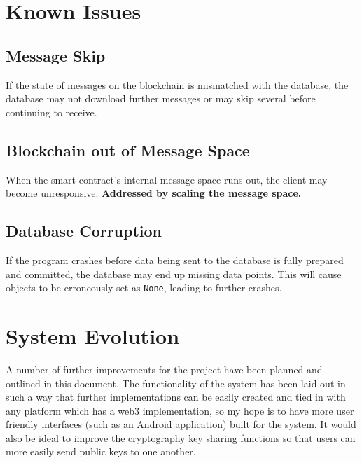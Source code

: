 \documentclass[titlepage]{report}
\begin{document}
\section{Known Issues}
\subsection{Message Skip}
If the state of messages on the \gls{blockchain} is mismatched with the database, the database may not download further messages or may skip several before continuing to receive.
\subsection{Blockchain out of Message Space}
When the smart contract's internal message space runs out, the client may become unresponsive. \textbf{Addressed by scaling the message space.}
\subsection{Database Corruption}
If the program crashes before data being sent to the database is fully prepared and committed, the database may end up missing data points. This will cause objects to be erroneously set as \texttt{None}, leading to further crashes.

\section{System Evolution}
A number of further improvements for the project have been planned and outlined in this document. The functionality of the system has been laid out in such a way that further implementations can be easily created and tied in with any platform which has a web3 implementation, so my hope is to have more user friendly interfaces (such as an Android application) built for the system. It would also be ideal to improve the cryptography key sharing functions so that users can more easily send public keys to one another.
\end{document}
